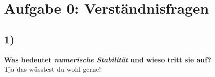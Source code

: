\setcounter{secnumdepth}{0}
\section{Aufgabe 0: Verständnisfragen}
\label{sec:auf0}

\subsection{1)}
\textbf{Was bedeutet \textit{numerische Stabilität} und wieso tritt sie auf?}\\
\newline
Tja das wüsstest du wohl gerne!